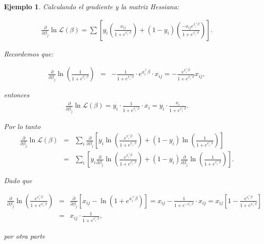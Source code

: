 \documentclass[12pt]{article}
\newtheorem{Ejem}{Ejemplo}%
\begin{document}
\begin{Ejem}
Calculando  el gradiente y la matriz Hessiana:

\begin{eqnarray*}
\frac{\partial}{\partial \beta_j} \ln \mathcal{L}(\beta)
= \sum \left[ y_i \left( \frac{x_{ij}}{1 + e^{x_i^\top \beta}} \right)
+ (1 - y_i) \left( \frac{-x_{ij} e^{x_i^\top \beta}}{1 + e^{x_i^\top \beta}} \right) \right].
\end{eqnarray*}


Recordemos que:

\begin{eqnarray*}
\frac{\partial}{\partial \beta_j} \ln \left( \frac{1}{1 + e^{x_i^\top \beta}} \right)
&=& - \frac{1}{1 + e^{x_i^\top \beta}} \cdot e^{x_i^\top \beta} \cdot x_{ij}
= - \frac{e^{x_i^\top \beta}}{1 + e^{x_i^\top \beta}} x_{ij},
\end{eqnarray*}

entonces
\begin{eqnarray*}
\frac{\partial}{\partial \beta_j} \ln \mathcal{L}(\beta)= y_i \cdot \frac{1}{1 + e^{x_i^\top \beta}} \cdot x_i
= y_i \cdot \frac{x_i}{1 + e^{x_i^\top \beta}}.
\end{eqnarray*}


Por lo tanto
\begin{eqnarray*}
\frac{\partial}{\partial \beta_j} \ln \mathcal{L}(\beta)
&=& \sum_i \frac{\partial}{\partial \beta_j} \left[
y_i \ln \left( \frac{e^{x_i^\top \beta}}{1 + e^{x_i^\top \beta}} \right)
+ (1 - y_i) \ln \left( \frac{1}{1 + e^{x_i^\top \beta}} \right)
\right]\\
&=& \sum_i \left[
y_i \frac{\partial}{\partial \beta_j} \ln \left( \frac{e^{x_i^\top \beta}}{1 + e^{x_i^\top \beta}} \right)
+ (1 - y_i) \frac{\partial}{\partial \beta_j} \ln \left( \frac{1}{1 + e^{x_i^\top \beta}} \right)
\right].
\end{eqnarray*}

Dado que

\begin{eqnarray*}
\frac{\partial}{\partial \beta_j} \ln \left( \frac{e^{x_i^\top \beta}}{1 + e^{x_i^\top \beta}} \right)
&=& \frac{\partial}{\partial \beta_j} \left[ x_{ij} - \ln \left( 1 + e^{x_i^\top \beta} \right) \right]
= x_{ij} - \frac{1}{1 + e^{-x_i^\top \beta}} \cdot x_{ij}= x_{ij} \left[ 1 - \frac{e^{x_i^\top \beta}}{1 + e^{x_i^\top \beta}} \right]\\
&=& x_{ij} \cdot \frac{1}{1 + e^{x_i^\top \beta}},
\end{eqnarray*}

por otra parte


\end{Ejem}
\end{document}

